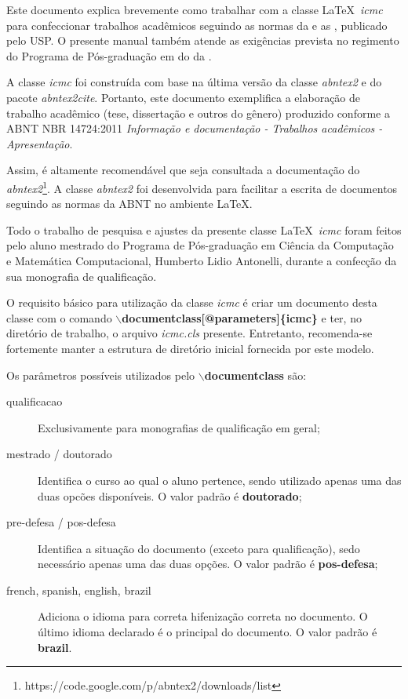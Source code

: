 \newcommand{\comando}[1]{\textbf{$\backslash$#1}}

Este documento explica brevemente como trabalhar com a classe \LaTeX~\textit{icmc} para confeccionar trabalhos acadêmicos seguindo as normas da  e as , publicado pelo  USP. O presente manual também atende as exigências prevista no regimento do Programa de Pós-graduação em  do  da .


A classe \textit{icmc} foi construída com base na última versão da classe \textit{abntex2} e do pacote \textit{abntex2cite}. Portanto, este documento exemplifica a elaboração de trabalho
acadêmico (tese, dissertação e outros do gênero) produzido conforme a ABNT NBR
14724:2011 \textit{Informação e documentação - Trabalhos acadêmicos - Apresentação}.

Assim, é altamente recomendável que seja consultada a documentação do \textit{abntex2}\footnote{https://code.google.com/p/abntex2/downloads/list}. A classe \textit{abntex2} foi desenvolvida para facilitar a escrita de documentos seguindo as normas da ABNT no ambiente \LaTeX\;\cite{frasson:2005:classe_abnt}.

Todo o trabalho de pesquisa e ajustes da presente classe \LaTeX~\emph{icmc} foram feitos pelo aluno mestrado do Programa de Pós-graduação em Ciência da Computação e Matemática Computacional, Humberto Lidio Antonelli, durante a confecção da sua monografia de qualificação.

O requisito básico para utilização da classe \textit{icmc} é criar um documento desta classe com o comando
\comando{documentclass[@parameters]\{icmc\}} e ter, no diretório de trabalho, o arquivo \emph{icmc.cls} presente. Entretanto, recomenda-se fortemente manter a estrutura de diretório inicial fornecida por este modelo.

Os parâmetros possíveis utilizados pelo \comando{documentclass} são:
\begin{description}
\item[qualificacao] Exclusivamente para monografias de qualificação em geral;
\item[mestrado / doutorado] Identifica o curso ao qual o aluno pertence, sendo utilizado apenas uma das duas opcões disponíveis. O valor padrão é \textbf{doutorado};
\item[pre-defesa / pos-defesa] Identifica a situação do documento (exceto para qualificação), sedo necessário apenas uma das duas opções. O valor padrão é \textbf{pos-defesa};
\item[french, spanish, english, brazil] Adiciona o idioma para correta hifenização correta no documento. O último idioma declarado é o principal do documento. O valor padrão é \textbf{brazil}.
\end{description}